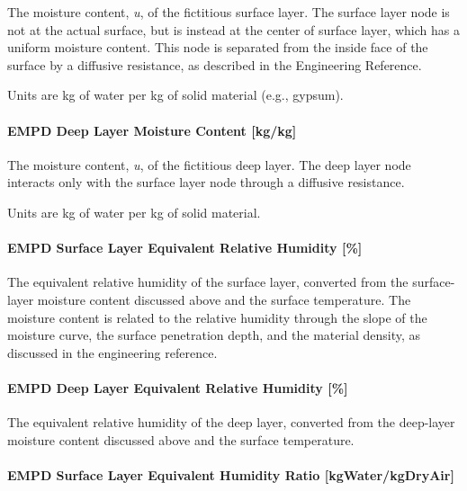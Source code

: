 The moisture content, \emph{u}, of the fictitious surface layer. The surface layer node is not at the actual surface, but is instead at the center of surface layer, which has a uniform moisture content. This node is separated from the inside face of the surface by a diffusive resistance, as described in the Engineering Reference.

Units are kg of water per kg of solid material (e.g., gypsum).

\paragraph{EMPD Deep Layer Moisture Content
	{[}kg/kg{]}}\label{empd-deep-layer-moisture-content-kgkg}

The moisture content, \emph{u}, of the fictitious deep layer. The deep layer node interacts only with the surface layer node through a diffusive resistance.

Units are kg of water per kg of solid material.

\paragraph{EMPD Surface Layer Equivalent Relative Humidity {[}\%{]}}\label{empd-surface-layer-equivalent-relative-humidity}

The equivalent relative humidity of the surface layer, converted from the surface-layer moisture content discussed above and the surface temperature. The moisture content is related to the relative humidity through the slope of the moisture curve, the surface penetration depth, and the material density, as discussed in the engineering reference.

\paragraph{EMPD Deep Layer Equivalent Relative Humidity {[}\%{]}}\label{empd-deep-layer-equivalent-relative-humidity}

The equivalent relative humidity of the deep layer, converted from the deep-layer moisture content discussed above and the surface temperature.

\paragraph{EMPD Surface Layer Equivalent Humidity Ratio	{[}kgWater/kgDryAir{]}}\label{empd-surface-layer-equivalent-humidity-ratio-kgwaterkgdryair}

